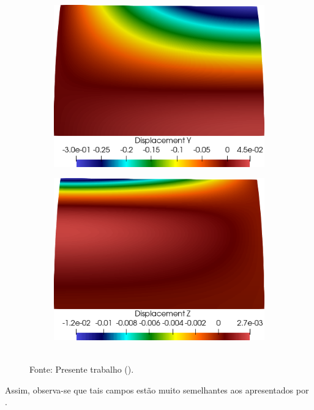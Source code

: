 \begin{figure}[h!]
\begin{subfigure}{0.31\textwidth}
    \end{subfigure}
    \begin{subfigure}{0.31\textwidth}
        \includegraphics[width=\linewidth]{Figuras/scordelis/uy.png}
    \end{subfigure}
    \begin{subfigure}{0.31\textwidth}
        \includegraphics[width=\linewidth]{Figuras/scordelis/uz.png}
    \end{subfigure}
    \\Fonte: Presente trabalho (\the\year).
    \label{fig:scordelis-displ}
\end{figure}

Assim, observa-se que tais campos estão muito semelhantes aos apresentados por .

